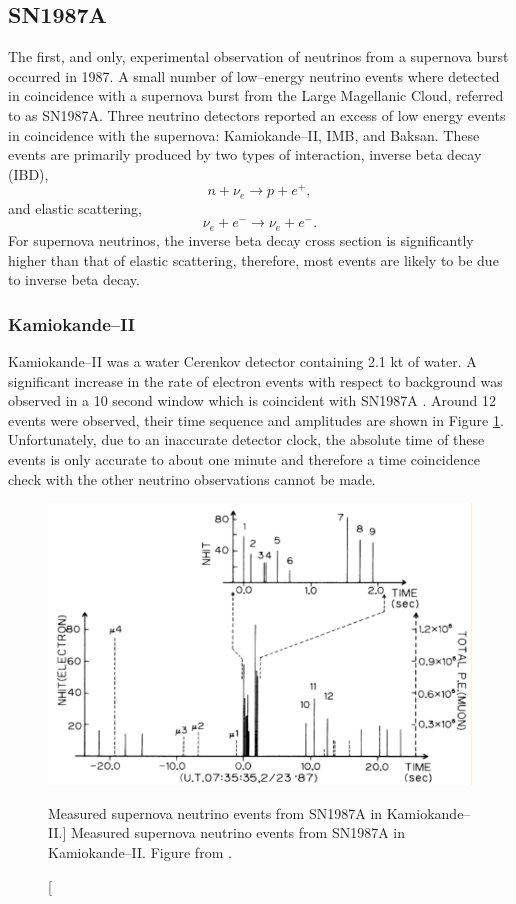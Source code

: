 {\subsection{SN1987A}

The first, and only, experimental observation of neutrinos from a supernova
burst occurred in 1987. A small number of low--energy neutrino events where
detected in coincidence with a supernova burst from the Large Magellanic Cloud,
referred to as SN1987A. Three neutrino detectors reported an excess of low
energy events in coincidence with the supernova: Kamiokande--II, IMB, and 
Baksan. These events are primarily produced by two types of interaction, inverse
beta decay (IBD),
\begin{equation}
	n + \nu_e \rightarrow p + e^+,
\end{equation}
and elastic scattering,
\begin{equation}
	\nu_e + e^- \rightarrow \nu_e + e^-.
\end{equation}
For supernova neutrinos, the inverse beta decay cross section is significantly 
higher than that of elastic scattering, therefore, most events are likely to be
due to inverse beta decay.

\subsubsection{Kamiokande--II}
Kamiokande--II was a water Cerenkov detector containing 2.1 kt of water. A
significant increase in the rate of electron events with respect to background
was observed in a 10 second window which is coincident with SN1987A 
\cite{Hirata:1987hu}. Around 12 events were observed, their time sequence and
amplitudes are shown in Figure \ref{fig:kami_1987}. Unfortunately, due to an
inaccurate detector clock, the absolute time of these events is only accurate to
about one minute and therefore a time coincidence check with the other neutrino
observations cannot be made.

\begin{figure}
	\centering
	\includegraphics{figures/kami_1987.pdf}
	\caption
	[Measured supernova neutrino events from SN1987A in Kamiokande--II.]
	{Measured supernova neutrino events from SN1987A in Kamiokande--II. Figure
	from \cite{Hirata:1987hu}.}
	\label{fig:kami_1987}
\end{figure}

}
